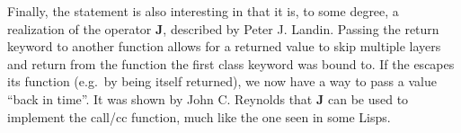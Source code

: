 Finally, the  statement is also interesting in that it is, to some degree,
a realization of the operator \textbf{J}, described by Peter J. Landin\cite{j}.
Passing the return keyword to another function allows for a returned value to skip
multiple layers and return from the function the first class keyword was bound to.
If the  escapes its function (e.g.\ by being itself returned), we now have
a way to pass a value ``back in time''. It was shown by John C. Reynolds that \textbf{J}
can be used to implement the call/cc function, much like the one seen in some Lisps\cite{defint}.
